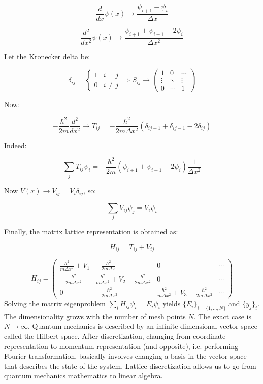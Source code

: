   $$\frac{d{}}{d{x}}\psi(x) \rightarrow \frac{\psi_{i+1}-\psi_i}{\Delta x}$$

  $$\frac{d{^2}}{d{x^2}}\psi(x) \rightarrow \frac{\psi_{i+1}+\psi_{i-1}-2\psi_i}{\Delta x^2}$$

  Let the Kronecker delta be:

      $$\delta_{ij} =\begin{cases}1 &i=j\\0 &i\neq j\end{cases}\Rightarrow S_{ij} \rightarrow\begin{pmatrix}1 & 0 & \cdots\\\vdots & \ddots &\vdots \\0&\cdots & 1 \end{pmatrix}$$

  Now:

  $$-\frac{\hbar^2}{2m}\frac{d{^2}}{d{x^2}}\rightarrow T_{ij}=-\frac{\hbar^2}{2m\Delta x^2}(\delta_{ij+1}+\delta_{ij-1}-2\delta_{ij})$$

  Indeed:

  $$\sum\limits_{j}T_{ij}\psi_i = -\frac{\hbar^2}{2m}(\psi_{i+1}+\psi_{i-1}-2\psi_i)\frac{1}{\Delta x^2}$$

  Now $V(x) \rightarrow V_{ij} = V_i\delta_{ij}$, so:

  $$\sum\limits_{j}V_{ij}\psi_j = V_i\psi_i$$

  Finally, the matrix lattice representation is obtained as:

  $$H_{ij} = T_{ij} + V_{ij}$$

  $$H_{ij} = \begin{pmatrix}\frac{\hbar^2}{m\Delta x^2} + V_1 & -\frac{\hbar^2}{2m\Delta x} & 0 & \cdots\\ -\frac{\hbar^2}{2m\Delta x^2} & \frac{\hbar^2}{m\Delta x^2}+V_2-\frac{\hbar^2}{2m \Delta x^2} & 0 & \cdots\\ 0 & -\frac{\hbar^2}{2m\Delta x^2} & \frac{\hbar^2}{m\Delta x^2}+V_3 - \frac{\hbar^2}{2m\Delta x^2} & \cdots\end{pmatrix}$$
\noindent
  Solving the matrix eigenproblem $\sum\limits_i H_{ij}\psi_i = E_i\psi_i$ yields $\{E_i\}_{i=\{1,\dots,N\}}$ and $\{y_j\}_i$. \\
  The dimensionality grows with the number of mesh points $N$.
  The exact case is $N\rightarrow\infty$.
  Quantum mechanics is described by an infinite dimensional vector space called the Hilbert space.
\noindent
  After discretization, changing from coordinate representation to momentum representation (and opposite), i.e. performing Fourier transformation, basically involves changing a basis in the vector space that describes the state of the system. 
  Lattice discretization allows us to go from quantum mechanics mathematics to linear algebra.

